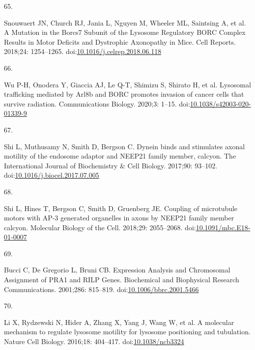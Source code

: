 \documentclass[
  12pt,
  a4paper,
]{book}
\newlength{\cslhangindent}
\newlength{\csllabelwidth}
\newlength{\cslentryspacingunit} %
\newenvironment{CSLReferences}[2] %
 {%
  \setlength{\parindent}{0pt}
  \ifodd #1
  \let\oldpar\par
  \def\par{\hangindent=\cslhangindent\oldpar}
  \fi
  \setlength{\parskip}{#2\cslentryspacingunit}
 }%
 {}
\newcommand{\CSLLeftMargin}[1]{\parbox[t]{\csllabelwidth}{#1}}
\newcommand{\CSLRightInline}[1]{\parbox[t]{\linewidth - \csllabelwidth}{#1}\break}
\begin{document}
\begin{CSLReferences}{0}{0}
\leavevmode{}%
\CSLLeftMargin{65. }%
\CSLRightInline{Snouwaert JN, Church RJ, Jania L, Nguyen M, Wheeler ML, Saintsing A, et al. A {Mutation} in the {Borcs7 Subunit} of the {Lysosome Regulatory BORC Complex Results} in {Motor Deficits} and {Dystrophic Axonopathy} in {Mice}. Cell Reports. 2018;24: 1254--1265. doi:\href{https://doi.org/10.1016/j.celrep.2018.06.118}{10.1016/j.celrep.2018.06.118}}

\leavevmode{}%
\CSLLeftMargin{66. }%
\CSLRightInline{Wu P-H, Onodera Y, Giaccia AJ, Le Q-T, Shimizu S, Shirato H, et al. Lysosomal trafficking mediated by {Arl8b} and {BORC} promotes invasion of cancer cells that survive radiation. Communications Biology. 2020;3: 1--15. doi:\href{https://doi.org/10.1038/s42003-020-01339-9}{10.1038/s42003-020-01339-9}}

\leavevmode{}%
\CSLLeftMargin{67. }%
\CSLRightInline{Shi L, Muthusamy N, Smith D, Bergson C. Dynein binds and stimulates axonal motility of the endosome adaptor and {NEEP21} family member, calcyon. The International Journal of Biochemistry \& Cell Biology. 2017;90: 93--102. doi:\href{https://doi.org/10.1016/j.biocel.2017.07.005}{10.1016/j.biocel.2017.07.005}}

\leavevmode{}%
\CSLLeftMargin{68. }%
\CSLRightInline{Shi L, Hines T, Bergson C, Smith D, Gruenberg JE. Coupling of microtubule motors with {AP-3} generated organelles in axons by {NEEP21} family member calcyon. Molecular Biology of the Cell. 2018;29: 2055--2068. doi:\href{https://doi.org/10.1091/mbc.E18-01-0007}{10.1091/mbc.E18-01-0007}}

\leavevmode{}%
\CSLLeftMargin{69. }%
\CSLRightInline{Bucci C, De Gregorio L, Bruni CB. Expression {Analysis} and {Chromosomal Assignment} of {PRA1} and {RILP Genes}. Biochemical and Biophysical Research Communications. 2001;286: 815--819. doi:\href{https://doi.org/10.1006/bbrc.2001.5466}{10.1006/bbrc.2001.5466}}

\leavevmode{}%
\CSLLeftMargin{70. }%
\CSLRightInline{Li X, Rydzewski N, Hider A, Zhang X, Yang J, Wang W, et al. A molecular mechanism to regulate lysosome motility for lysosome positioning and tubulation. Nature Cell Biology. 2016;18: 404--417. doi:\href{https://doi.org/10.1038/ncb3324}{10.1038/ncb3324}}


\end{CSLReferences}
\end{document}
